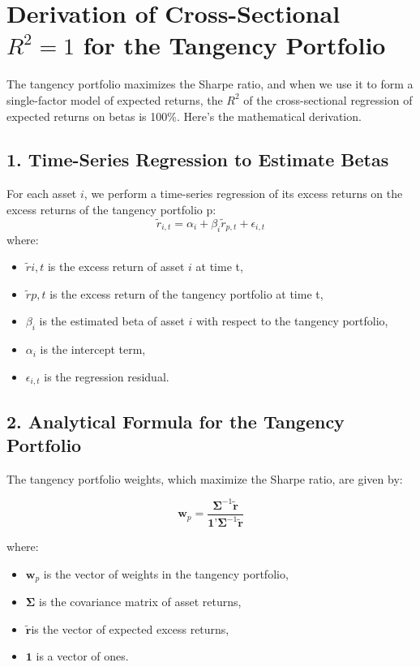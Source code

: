 \documentclass{article}
\begin{document}
\section*{Derivation of Cross-Sectional $R^2 = 1$ for the Tangency Portfolio}

The tangency portfolio maximizes the Sharpe ratio, and when we use it to form a single-factor model of expected returns, the $R^2$ of the cross-sectional regression of expected returns on betas is 100\%. Here’s the mathematical derivation.

\subsection*{1. Time-Series Regression to Estimate Betas}

For each asset $i$, we perform a time-series regression of its excess returns on the excess returns of the tangency portfolio p:
\begin{equation}
\tilde{r}_{i,t} = \alpha_i + \beta_i \tilde{r}_{p,t} + \epsilon_{i,t}
\end{equation}
where:

\begin{itemize}
\item $\tilde{r}{i,t}$ is the excess return of asset $i$ at time t,
\item $\tilde{r}{p,t}$ is the excess return of the tangency portfolio at time t,
\item $\beta_i$ is the estimated beta of asset $i$ with respect to the tangency portfolio,
\item $\alpha_i$ is the intercept term,
\item $\epsilon_{i,t}$ is the regression residual.
\end{itemize}

\subsection*{2. Analytical Formula for the Tangency Portfolio}

The tangency portfolio weights, which maximize the Sharpe ratio, are given by:

\begin{equation}
\mathbf{w}_p = \frac{\boldsymbol{\Sigma}^{-1} \tilde{\mathbf{r}}}{\mathbf{1}’ \boldsymbol{\Sigma}^{-1} \tilde{\mathbf{r}}}
\end{equation}

where:

\begin{itemize}

\item $\mathbf{w}_p$ is the vector of weights in the tangency portfolio,
\item \( \boldsymbol{\Sigma} \) is the covariance matrix of asset returns,
\item $\tilde{\mathbf{r}}$is the vector of expected excess returns,
\item $\mathbf{1}$ is a vector of ones.
\end{itemize}
\end{document}
